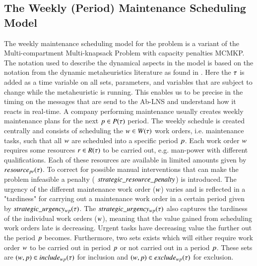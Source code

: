 \subsection{The Weekly (Period) Maintenance Scheduling Model}
The weekly maintenance scheduling model for the problem
is a variant of the  Multi-compartment Multi-knapsack Problem with capacity penalties MCMKP.
The notation used to describe the dynamical aspects in the model is based on the notation
from the dynamic metaheuristics literature as found in \cite{yangMetaheuristicsDynamicCombinatorial2013}.
Here the $\tau$ is added as a time variable on all sets, parameters, and variables that are
subject to change while the metaheuristic is running. This enables us to be precise in the timing on
the messages that are send to the Ab-LNS and understand how it reacts in real-time.
A company performing maintenance usually creates weekly maintenance plans for
the next $p \in P(\tau)$ period. The weekly schedule is created
centrally and consists of scheduling the $\ElementWorkOrder \in \SetWorkOrder$
work orders, i.e. maintenance tasks, such that all $w$
are scheduled into a specific period $p$. Each work order $
w$ requires some resources $r \in R(\tau)$
to be carried out, e.g. man-power with different qualifications. Each of these
resources are available in limited amounts given by $\ParStrategicResource$. To correct
for possible manual interventions that can make the problem infeasible a penalty (
$strategic\_resource\_penalty$) is introduced. The urgency of the different maintenance work order ($w$)
varies and is reflected in a "tardiness" for carrying out a maintenance work
order in a certain period given by $strategic\_urgency_{w p}(\tau)$. The $strategic\_urgency_{w p}(\tau)$ also
captures the tardiness of the individual work orders ($w$), meaning that
the value gained from scheduling work orders late is decreasing. Urgent tasks have
decreasing value the further out the period $p$ becomes.
Furthermore, two sets exists which will either require work order $w$ to be carried
out in period $p$ or not carried out in a period $p$.
These sets are $(w,p) \in
include_{wp}(\tau)$ for inclusion and  $(w, p) \in
exclude_{wp}(\tau)$ for exclusion.


\strategicmodel[clustering=true, beta=false]

